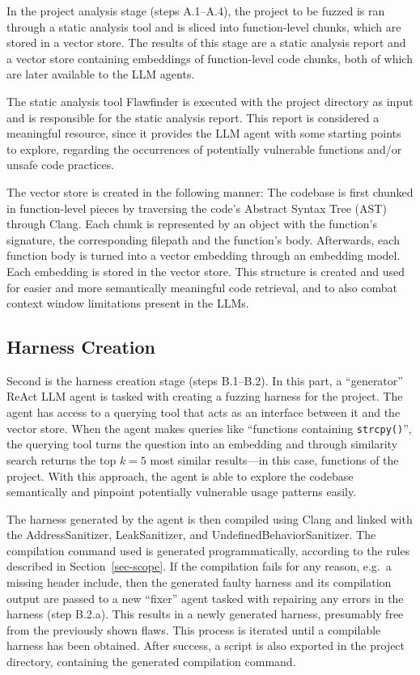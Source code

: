 \documentclass[
  a4paper,
]{scrreprt}
\theoremstyle{definition}
\theoremstyle{remark}
\begin{document}
In the project analysis stage (steps A.1--A.4), the project to be fuzzed
is ran through a static analysis tool and is sliced into function-level
chunks, which are stored in a vector store. The results of this stage
are a static analysis report and a vector store containing embeddings of
function-level code chunks, both of which are later available to the LLM
agents.

The static analysis tool Flawfinder \autocite{flawfinder} is executed
with the project directory as input and is responsible for the static
analysis report. This report is considered a meaningful resource, since
it provides the LLM agent with some starting points to explore,
regarding the occurrences of potentially vulnerable functions and/or
unsafe code practices.

The vector store is created in the following manner: The codebase is
first chunked in function-level pieces by traversing the code's Abstract
Syntax Tree (AST) through Clang. Each chunk is represented by an object
with the function's signature, the corresponding filepath and the
function's body. Afterwards, each function body is turned into a vector
embedding through an embedding model. Each embedding is stored in the
vector store. This structure is created and used for easier and more
semantically meaningful code retrieval, and to also combat context
window limitations present in the LLMs.

\subsection{Harness Creation}\label{sec-creation}

Second is the harness creation stage (steps B.1--B.2). In this part, a
``generator'' ReAct LLM agent is tasked with creating a fuzzing harness
for the project. The agent has access to a querying tool that acts as an
interface between it and the vector store. When the agent makes queries
like ``functions containing \texttt{strcpy()}'', the querying tool turns
the question into an embedding and through similarity search returns the
top \(k=5\) most similar results---in this case, functions of the
project. With this approach, the agent is able to explore the codebase
semantically and pinpoint potentially vulnerable usage patterns easily.

The harness generated by the agent is then compiled using Clang and
linked with the AddressSanitizer, LeakSanitizer, and
UndefinedBehaviorSanitizer. The compilation command used is generated
programmatically, according to the rules described in
Section~\ref{sec-scope}. If the compilation fails for any reason, e.g.~a
missing header include, then the generated faulty harness and its
compilation output are passed to a new ``fixer'' agent tasked with
repairing any errors in the harness (step B.2.a). This results in a
newly generated harness, presumably free from the previously shown
flaws. This process is iterated until a compilable harness has been
obtained. After success, a script is also exported in the project
directory, containing the generated compilation command.
\end{document}

